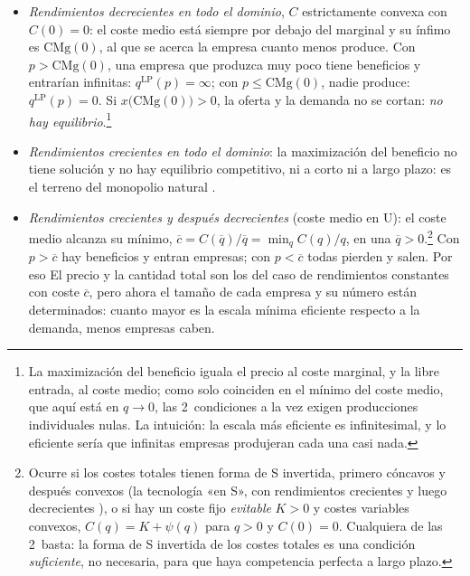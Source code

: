 \documentclass[11pt]{article}
\begin{document}
\begin{itemize}
\begin{itemize}
\begin{itemize}
    \item La oferta a largo plazo es horizontal en $c$ y se intercambia $x(c)$, pero el número de empresas y lo que produce cada una quedan \emph{indeterminados}: sirve cualquier par con $J^*q^*=x(c)$. La oferta de cada empresa y la de la industria son las 2~horizontales en $c$, pero no son la misma curva: la industria puede ofrecer cualquier cantidad sumando empresas.
    \end{itemize}
  \item \emph{Rendimientos decrecientes en todo el dominio}, $C$ estrictamente convexa con $C(0)=0$: el coste medio está siempre por debajo del marginal y su ínfimo es $\mathrm{CMg}(0)$, al que se acerca la empresa cuanto menos produce. Con $p>\mathrm{CMg}(0)$, una empresa que produzca muy poco tiene beneficios y entrarían infinitas: $q^{\mathrm{LP}}(p)=\infty$; con $p\leq\mathrm{CMg}(0)$, nadie produce: $q^{\mathrm{LP}}(p)=0$. Si $x\big(\mathrm{CMg}(0)\big)>0$, la oferta y la demanda no se cortan: \emph{no hay equilibrio}.\footnote{La maximización del beneficio iguala el precio al coste marginal, y la libre entrada, al coste medio; como solo coinciden en el mínimo del coste medio, que aquí está en $q\to 0$, las 2~condiciones a la vez exigen producciones individuales nulas. La intuición: la escala más eficiente es infinitesimal, y lo eficiente sería que infinitas empresas produjeran cada una casi nada.}
  \item \emph{Rendimientos crecientes en todo el dominio}: la maximización del beneficio no tiene solución y no hay equilibrio competitivo, ni a corto ni a largo plazo: es el terreno del monopolio natural .
  \item \emph{Rendimientos crecientes y después decrecientes} (coste medio en U): el coste medio alcanza su mínimo, $\overline{c}=C(\overline{q})/\overline{q}=\min_qC(q)/q$, en una  $\overline{q}>0$.\footnote{Ocurre si los costes totales tienen forma de S invertida, primero cóncavos y después convexos (la tecnología «en S», con rendimientos crecientes y luego decrecientes ), o si hay un coste fijo \emph{evitable} $K>0$ y costes variables convexos, $C(q)=K+\psi(q)$ para $q>0$ y $C(0)=0$\nocite{MasColellWhinstonGreen1995}. Cualquiera de las 2~basta: la forma de S invertida de los costes totales es una condición \emph{suficiente}, no necesaria, para que haya competencia perfecta a largo plazo.} Con $p>\overline{c}$ hay beneficios y entran empresas; con $p<\overline{c}$ todas pierden y salen. Por eso
  El precio y la cantidad total son los del caso de rendimientos constantes con coste $\overline{c}$, pero ahora el tamaño de cada empresa y su número están determinados: cuanto mayor es la escala mínima eficiente respecto a la demanda, menos empresas caben.
  \end{itemize}
\end{itemize}
\end{document}
